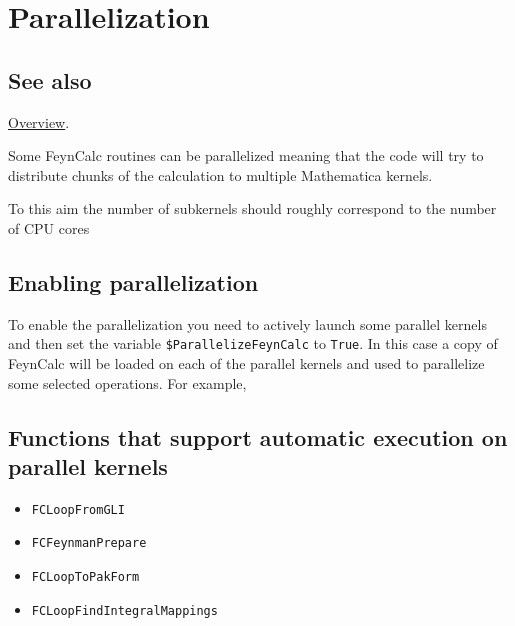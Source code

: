 \documentclass[../FeynCalcManual.tex]{subfiles}
\begin{document}
\hypertarget{parallelization}{
\section{Parallelization}\label{parallelization}}

\subsection{See also}

\hyperlink{toc}{Overview}.

Some FeynCalc routines can be parallelized meaning that the code will
try to distribute chunks of the calculation to multiple Mathematica
kernels.

To this aim the number of subkernels should roughly correspond to the
number of CPU cores

\subsection{Enabling parallelization}\label{enabling-parallelization}

To enable the parallelization you need to actively launch some parallel
kernels and then set the variable \texttt{\$ParallelizeFeynCalc} to
\texttt{True}. In this case a copy of FeynCalc will be loaded on each of
the parallel kernels and used to parallelize some selected operations.
For example,

\begin{Shaded}
\begin{Highlighting}[]
\OperatorTok{[}\OperatorTok{]}
\ExtensionTok{=} 
\end{Highlighting}
\end{Shaded}

\subsection{Functions that support automatic execution on parallel
kernels}\label{functions-that-support-automatic-execution-on-parallel-kernels}

\begin{itemize}
\tightlist
\item
  \texttt{FCLoopFromGLI}
\item
  \texttt{FCFeynmanPrepare}
\item
  \texttt{FCLoopToPakForm}
\item
  \texttt{FCLoopFindIntegralMappings}
\end{itemize}
\end{document}
